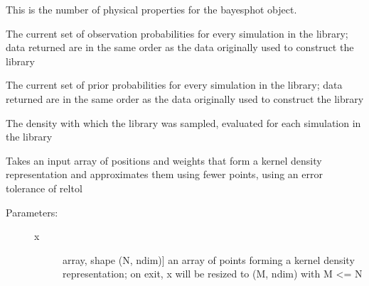 \documentclass[letterpaper,10pt,english]{sphinxmanual}
\begin{document}
\begin{fulllineitems}
\begin{fulllineitems}
\label{\detokenize{bayesphot:slugpy.bayesphot.bp.bp.nphys}}
This is the number of physical properties for the bayesphot
object.

\end{fulllineitems}


\begin{fulllineitems}
\label{\detokenize{bayesphot:slugpy.bayesphot.bp.bp.pobs}}
The current set of observation probabilities for every
simulation in the library; data returned are in the same order
as the data originally used to construct the library

\end{fulllineitems}


\begin{fulllineitems}
\label{\detokenize{bayesphot:slugpy.bayesphot.bp.bp.priors}}
The current set of prior probabilities for every
simulation in the library; data returned are in the same order
as the data originally used to construct the library

\end{fulllineitems}


\begin{fulllineitems}
\label{\detokenize{bayesphot:slugpy.bayesphot.bp.bp.sample_density}}
The density with which the library was sampled, evaluated for
each simulation in the library

\end{fulllineitems}


\begin{fulllineitems}
\label{\detokenize{bayesphot:slugpy.bayesphot.bp.bp.squeeze_rep}}
Takes an input array of positions and weights that form a
kernel density representation and approximates them using
fewer points, using an error tolerance of reltol
\begin{description}
\item[{Parameters:}] \leavevmode\begin{description}
\item[{x}] \leavevmode{[}array, shape (N, ndim){]}
an array of points forming a kernel density
representation; on exit, x will be resized to (M, ndim)
with M \textless{}= N


\end{description}
\end{description}
\end{fulllineitems}
\end{fulllineitems}
\end{document}

